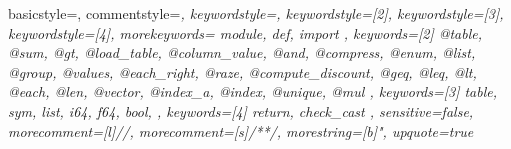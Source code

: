 \newcommand{\refSec}[1]{Sec.~\ref{#1}}
\newcommand{\refFig}[1]{Fig.~\ref{#1}}
\newcommand{\refTable}[1]{Table~\ref{#1}}
\newcommand{\refListing}[1]{Listing~\ref{#1}}
\newcommand{\refAlgo}[1]{Algo.~\ref{#1}}
\newcommand{\refFoot}[1]{\footnote{\footnotesize{#1}}}

\usepackage{textcomp} %
{ basicstyle=\footnotesize\ttfamily,
  commentstyle=\color{Grey}\rmfamily\itshape,
  keywordstyle=\color{SlightPink},
  keywordstyle=[2]\color{NiceBlue},
  keywordstyle=[3]\color{NiceRed},
  keywordstyle=[4]\color{SlightRed},
  morekeywords={
  module,
  def,
  import
  },
  keywords=[2]{
  @table,
  @sum,
  @gt,
  @load_table,
  @column_value,
  @and,
  @compress,
  @enum,
  @list,
  @group,
  @values,
  @each_right,
  @raze,
  @compute_discount,
  @geq,
  @leq,
  @lt,
  @each,
  @len,
  @vector,
  @index_a,
  @index,
  @unique,
  @mul
  },
  keywords=[3]{
  table,
  sym,
  list,
  i64,
  f64,
  bool,
  },
  keywords=[4]{
  return,
  check_cast
  },
  sensitive=false, %
  morecomment=[l]{//}, %
  morecomment=[s]{/*}{*/}, %
  morestring=[b]", %
  upquote=true %
}

\usepackage[subtle]{savetrees}  %
\usepackage{balance} %




